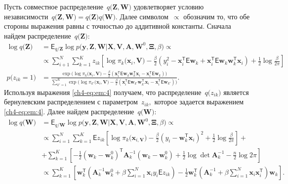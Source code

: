 \documentclass{dissert}
\begin{document}
Пусть совместное распределение~$q\bigr(\mathbf{Z}, \mathbf{W}\bigr)$ удовлетворяет условию независимости~$q\bigr(\mathbf{Z}, \mathbf{W}\bigr) = q\bigr(\mathbf{Z}\bigr)q\bigr(\mathbf{W}\bigr)$. 
Далее символом~$\propto$ обозначим то, что обе стороны выражения равны с точностью до аддитивной константы.
Сначала найдем распределение~$q\bigr(\textbf{Z}\bigr)$:
\[
\label{ch4-eq:em:4}
\begin{aligned}
\log q\bigr(\textbf{Z}\bigr) &= \mathsf{E}_{q/\textbf{Z}} \log p\bigr(\mathbf{y}, \mathbf{Z}, \mathbf{W}|\mathbf{X}, \mathbf{V}, \textbf{A}, \textbf{W}^{0}, \bm{\Xi}, \beta\bigr)  \propto\\
&\propto \sum_{i+1}^{N}\sum_{k=1}^{K}z_{ik}\left[\log\pi_{k}\bigr(\textbf{x}_{i}, \textbf{V}\bigr) - \frac{\beta}{2}\left(y_{i}^{2} -\textbf{x}_{i}^{\mathsf{T}}\mathsf{E}\textbf{w}_{k} + \textbf{x}_{i}^{\mathsf{T}}\mathsf{E}\textbf{w}_{k}\textbf{w}_{k}^{\mathsf{T}}\textbf{x}_{i}\right) + \frac{1}{2}\log\frac{\beta}{2\pi}\right]\\
p\bigr(z_{ik} = 1\bigr) &= \frac{\exp\bigr(\log\pi_{k}\bigr(\textbf{x}_{i}, \textbf{V}\bigr) - \frac{\beta}{2}\left(\textbf{x}_{i}^{\mathsf{T}}\mathsf{E}\textbf{w}_{k}\textbf{w}_{k}^{\mathsf{T}}\textbf{x}_{i} - \textbf{x}_{i}^{\mathsf{T}}\mathsf{E}\textbf{w}_{k}\right)\bigr)}{\sum_{k'=1}^{K}\exp\bigr(\log\pi_{k'}\bigr(\textbf{x}_{i}, \textbf{V}\bigr) - \frac{\beta}{2}\left(\textbf{x}_{i}^{\mathsf{T}}\mathsf{E}\textbf{w}_{k'}\textbf{w}_{k'}^{\mathsf{T}}\textbf{x}_{i} - \textbf{x}_{i}^{\mathsf{T}}\mathsf{E}\textbf{w}_{k'}\right)\bigr)}.
\end{aligned}
\]
Используя выражения \eqref{ch4-eq:em:4} получаем, что распределение~$q\bigr(z_{ik}\bigr)$ является бернулевским распределением с параметром~$z_{ik},$ которое задается выражением \eqref{ch4-eq:em:4}.
Далее найдем распределение~$q\bigr(\textbf{W}\bigr)$:
\[
\label{ch4-eq:em:5}
\begin{aligned}
\log q\bigr(\textbf{W}\bigr) &= \mathsf{E}_{q/\textbf{W}}\log p\bigr(\mathbf{y}, \mathbf{Z}, \mathbf{W}|\mathbf{X}, \mathbf{V}, \textbf{A}, \textbf{W}^{0}, \bm{\Xi}, \beta\bigr) \propto\\
&\propto \sum_{i=1}^{N}\sum_{k=1}^{K}\mathsf{E}z_{ik}\left[\log\pi_{k}\bigr(\textbf{x}_{i, \textbf{V}}\bigr) - \frac{\beta}{2}\left(y_{i} - \textbf{w}_{k}^{\mathsf{T}}\textbf{x}_{i}\right)^{2} + \frac{1}{2}\log\frac{\beta}{2\pi}\right] + \\
&+ \sum_{k=1}^{K}\left[-\frac{1}{2}\left(\textbf{w}_{k} - \textbf{w}_{k}^{0}\right)^{\mathsf{T}}\textbf{A}_{k}^{-1}\left(\textbf{w}_{k} - \textbf{w}_{k}^{0}\right) + \frac{1}{2}\log\det\textbf{A}^{-1}_{k} - \frac{n}{2}\log2\pi\right] \\
&\propto \sum_{k=1}^{K}\left[\textbf{w}_{k}^{\mathsf{T}}\left(\textbf{A}_{k}^{-1}\textbf{w}_{k}^{0}+\beta\sum_{i=1}^{N}\textbf{x}_{i}y_{i}\mathsf{E}z_{ik}\right)-\frac{1}{2}\textbf{w}_{k}^{\mathsf{T}}\left(\textbf{A}_{k}^{-1}+\beta\sum_{i=1}^{N}\textbf{x}_{i}\textbf{x}_{i}^{\mathsf{T}}\right)\textbf{w}_{k}\right].
\end{aligned}
\]
\end{document}
